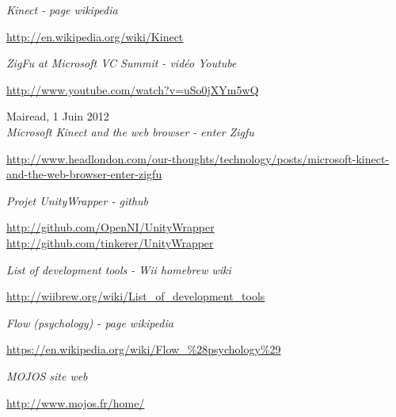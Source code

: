 \begin{thebibliography}{9}
  \emph{Kinect - page wikipedia}\\
  \begin{small}
  \url{http://en.wikipedia.org/wiki/Kinect}
  \end{small}
  
  \emph{ZigFu at Microsoft VC Summit - vidéo Youtube}\\
  \begin{small}
  \url{http://www.youtube.com/watch?v=uSo0jXYm5wQ}
  \end{small}
  
  Mairead, 1 Juin 2012\\
  \emph{Microsoft Kinect and the web browser - enter Zigfu}\\
  \begin{small}
  \url{http://www.headlondon.com/our-thoughts/technology/posts/microsoft-kinect-and-the-web-browser-enter-zigfu}
  \end{small}
  
  \emph{Projet UnityWrapper - github}\\
  \begin{small}
  \url{http://github.com/OpenNI/UnityWrapper}\\
  \url{http://github.com/tinkerer/UnityWrapper}
  \end{small}
  
  \emph{List of development tools - Wii homebrew wiki}\\
  \begin{small}
  \url{http://wiibrew.org/wiki/List_of_development_tools}
  \end{small}
  
  \emph{Flow (psychology) - page wikipedia}\\
  \begin{small}
  \url{https://en.wikipedia.org/wiki/Flow_\%28psychology\%29}
  \end{small}
  
  \emph{MOJOS site web}\\
  \begin{small}
  \url{http://www.mojos.fr/home/}
  \end{small}
  
\end{thebibliography}
        
